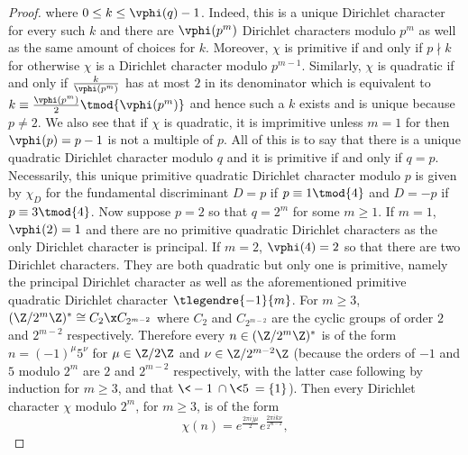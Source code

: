 \begin{proof}
      where $0 \le k \le \vphi(q)-1$. Indeed, this is a unique Dirichlet character for every such $k$ and there are $\vphi(p^{m})$ Dirichlet characters modulo $p^{m}$ as well as the same amount of choices for $k$. Moreover, $\chi$ is primitive if and only if $p \nmid k$ for otherwise $\chi$ is a Dirichlet character modulo $p^{m-1}$. Similarly, $\chi$ is quadratic if and only if $\frac{k}{\vphi(p^{m})}$ has at most $2$ in its denominator which is equivalent to $k \equiv \frac{\vphi(p^{m})}{2} \tmod{\vphi(p^{m})}$ and hence such a $k$ exists and is unique because $p \neq 2$. We also see that if $\chi$ is quadratic, it is imprimitive unless $m = 1$ for then $\vphi(p) = p-1$ is not a multiple of $p$. All of this is to say that there is a unique quadratic Dirichlet character modulo $q$ and it is primitive if and only if $q = p$. Necessarily, this unique primitive quadratic Dirichlet character modulo $p$ is given by $\chi_{D}$ for the fundamental discriminant $D = p$ if $p \equiv 1 \tmod{4}$ and $D = -p$ if $p \equiv 3 \tmod{4}$. Now suppose $p = 2$ so that $q = 2^{m}$ for some $m \ge 1$. If $m = 1$, $\vphi(2) = 1$ and there are no primitive quadratic Dirichlet characters as the only Dirichlet character is principal. If $m = 2$, $\vphi(4) = 2$ so that there are two Dirichlet characters. They are both quadratic but only one is primitive, namely the principal Dirichlet character as well as the aforementioned primitive quadratic Dirichlet character $\tlegendre{-1}{m}$. For $m \ge 3$, $(\Z/2^{m}\Z)^{\ast} \cong C_{2} \x C_{2^{m-2}}$ where $C_{2}$ and $C_{2^{m-2}}$ are the cyclic groups of order $2$ and $2^{m-2}$ respectively. Therefore every $n \in (\Z/2^{m}\Z)^{\ast}$ is of the form $n = (-1)^{\mu}5^{\nu}$ for $\mu \in \Z/2\Z$ and $\nu \in \Z/2^{m-2}\Z$ (because the orders of $-1$ and $5$ modulo $2^{m}$ are $2$ and $2^{m-2}$ respectively, with the latter case following by induction for $m \ge 3$, and that $\<-1\> \cap \<5\> = \{1\}$). Then every Dirichlet character $\chi$ modulo $2^{m}$, for $m \ge 3$, is of the form
      \[
        \chi(n) = e^{\frac{2\pi ij\mu}{2}}e^{\frac{2\pi ik\nu}{2^{m-2}}},
      \]

\end{proof}
